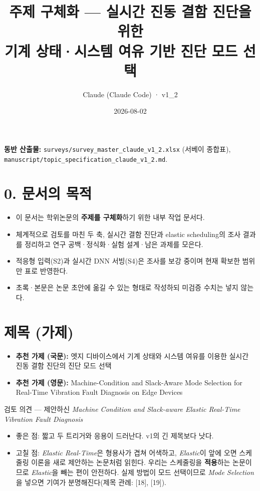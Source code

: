 \documentclass[10pt]{article}
\title{주제 구체화 --- 실시간 진동 결함 진단을 위한\\ 기계 상태·시스템 여유 기반 진단 모드 선택}
\author{Claude (Claude Code) · v1\_2}
\date{2026-08-02}
\begin{document}
\maketitle

\noindent\textbf{동반 산출물:} \texttt{surveys/survey\_master\_claude\_v1\_2.xlsx} (서베이 종합표), \texttt{manuscript/topic\_specification\_claude\_v1\_2.md}.

\section*{0. 문서의 목적}
\begin{itemize}
\item 이 문서는 학위논문의 \textbf{주제를 구체화}하기 위한 내부 작업 문서다.
\item 체계적으로 검토를 마친 두 축, 실시간 결함 진단과 elastic scheduling의 조사 결과를 정리하고 연구 공백·정식화·실험 설계·남은 과제를 모은다.
\item 적응형 입력(S2)과 실시간 DNN 서빙(S4)은 조사를 보강 중이며 현재 확보한 범위만 표로 반영한다.
\item 초록·본문은 논문 초안에 옮길 수 있는 형태로 작성하되 미검증 수치는 넣지 않는다.
\end{itemize}

\section{제목 (가제)}
\begin{itemize}
\item \textbf{추천 가제 (국문):} 엣지 디바이스에서 기계 상태와 시스템 여유를 이용한 실시간 진동 결함 진단의 진단 모드 선택
\item \textbf{추천 가제 (영문):} Machine-Condition and Slack-Aware Mode Selection for Real-Time Vibration Fault Diagnosis on Edge Devices
\end{itemize}

\noindent 검토 의견 --- 제안하신 \emph{Machine Condition and Slack-aware Elastic Real-Time Vibration Fault Diagnosis}
\begin{itemize}
\item 좋은 점: 짧고 두 트리거와 응용이 드러난다. v1의 긴 제목보다 낫다.
\item 고칠 점: \emph{Elastic Real-Time}은 형용사가 겹쳐 어색하고, \emph{Elastic}이 앞에 오면 스케줄링 이론을 새로 제안하는 논문처럼 읽힌다. 우리는 스케줄링을 \textbf{적용}하는 논문이므로 \emph{Elastic}을 빼는 편이 안전하다. 실제 방법이 모드 선택이므로 \emph{Mode Selection}을 넣으면 기여가 분명해진다(제목 관례: [18], [19]).
\end{itemize}
\end{document}
